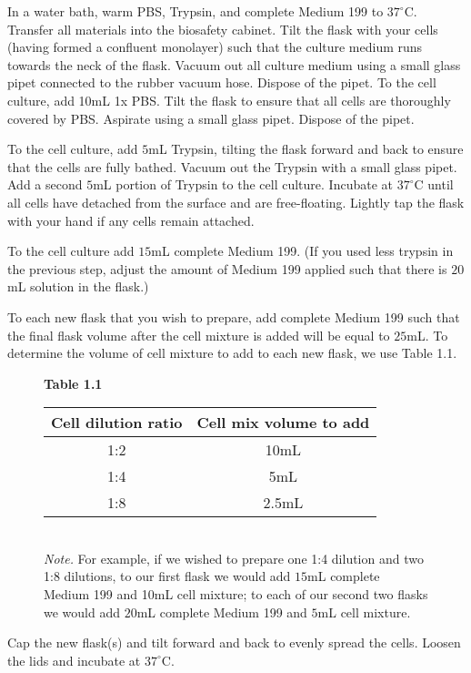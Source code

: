 In a water bath, warm PBS, Trypsin, and complete Medium 199 to $37^{\circ}$C. Transfer all materials into the biosafety cabinet. Tilt the flask with your cells (having formed a confluent monolayer) such that the culture medium runs towards the neck of the flask. Vacuum out all culture medium using a small glass pipet connected to the rubber vacuum hose. Dispose of the pipet. To the cell culture, add 10mL 1x PBS. Tilt the flask to ensure that all cells are thoroughly covered by PBS. Aspirate using a small glass pipet. Dispose of the pipet.

To the cell culture, add $5$mL Trypsin, tilting the flask forward and back to ensure that the cells are fully bathed. Vacuum out the Trypsin with a small glass pipet. Add a second $5$mL portion of Trypsin to the cell culture. Incubate at $37^{\circ}$C until all cells have detached from the surface and are free-floating. Lightly tap the flask with your hand if any cells remain attached.

To the cell culture add $15$mL complete Medium 199. (If you used less trypsin in the previous step, adjust the amount of Medium 199 applied such that there is $20$mL solution in the flask.)

To each new flask that you wish to prepare, add complete Medium 199 such that the final flask volume after the cell mixture is added will be equal to $25$mL. To determine the volume of cell mixture to add to each new flask, we use Table 1.1.

\begin{figure}[htp]
{\bfseries Table 1.1}\\[0.1cm]
\begin{tabular*}{\textwidth}{c c}
\hline
Cell dilution ratio & Cell mix volume to add \\
\hline
1:2 & 10mL \\
1:4 & 5mL \\
1:8 & 2.5mL \\
\hline
\end{tabular*}\\[0.1cm]
{\small {\itshape Note.} For example, if we wished to prepare one 1:4 dilution and two 1:8 dilutions, to our first flask we would add $15$mL complete Medium 199 and 10mL cell mixture; to each of our second two flasks we would add $20$mL complete Medium 199 and $5$mL cell mixture.}
\end{figure}

Cap the new flask(s) and tilt forward and back to evenly spread the cells. Loosen the lids and incubate at $37^{\circ}$C.

